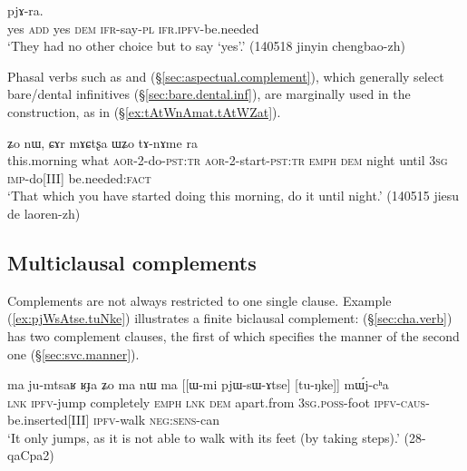\begin{exe}
\ex   \label{ex:totinW.pjAra}
\gll [``ɣa" nɤ ``ɣa" nɯ to-ti-nɯ] pjɤ-ra. \\
yes \textsc{add} yes \textsc{dem} \textsc{ifr}-say-\textsc{pl} \textsc{ifr}.\textsc{ipfv}-be.needed \\
\glt `They had no other choice but to say `yes'.' (140518 jinyin chengbao-zh)
\end{exe}

Phasal verbs such as  and  (§\ref{sec:aspectual.complement}), which generally select bare/dental infinitives (§\ref{sec:bare.dental.inf}), are marginally used in the construction, as in (§\ref{ex:tAtWnAmat.tAtWZat}).  
 
\begin{exe}
\ex \label{ex:tAtWnAmat.tAtWZat}
  ʑo nɯ, ɕɤr mɤɕtʂa ɯʑo tɤ-nɤme ra \\
 this.morning what \textsc{aor}-2-do-\textsc{pst}:\textsc{tr} \textsc{aor}-2-start-\textsc{pst}:\textsc{tr} \textsc{emph} \textsc{dem} night until \textsc{3sg} \textsc{imp}-do[III] be.needed:\textsc{fact} \\
\glt `That which you have started doing this morning, do it until night.' (140515 jiesu de laoren-zh)
\end{exe}

\subsection{Multiclausal complements} \label{sec:multiclausal.complements}
Complements are not always restricted to one single clause. Example (\ref{ex:pjWsAtse.tuNke}) illustrates a finite biclausal complement:  (§\ref{sec:cha.verb}) has two complement clauses, the first of which  specifies the manner of the second one (§\ref{sec:svc.manner}).

\begin{exe}
\ex \label{ex:pjWsAtse.tuNke}
\gll ma ju-mtsaʁ ʁɟa ʑo ma nɯ ma [[ɯ-mi pjɯ-sɯ-ɤtse] [tu-ŋke]] mɯ́j-cʰa\\
\textsc{lnk} \textsc{ipfv}-jump completely \textsc{emph} \textsc{lnk} \textsc{dem} apart.from \textsc{3sg}.\textsc{poss}-foot \textsc{ipfv}-\textsc{caus}-be.inserted[III] \textsc{ipfv}-walk \textsc{neg}:\textsc{sens}-can \\
\glt `It only jumps, as it is not able to walk with its feet (by taking steps).'  (28-qaCpa2)
\end{exe} 


